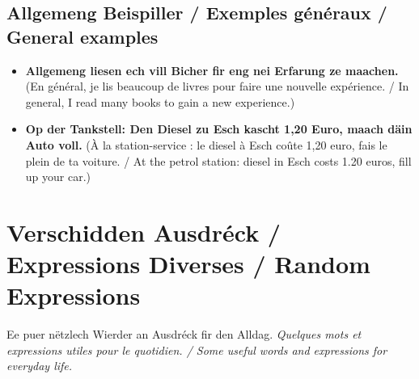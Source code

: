 \subsection{Allgemeng Beispiller / Exemples généraux / General examples}
\begin{itemize}
    \item \textbf{Allgemeng liesen ech vill Bicher fir eng nei Erfarung ze maachen.} (En général, je lis beaucoup de livres pour faire une nouvelle expérience. / In general, I read many books to gain a new experience.)
    \item \textbf{Op der Tankstell: Den Diesel zu Esch kascht 1,20 Euro, maach däin Auto voll.} (À la station-service : le diesel à Esch coûte 1,20 euro, fais le plein de ta voiture. / At the petrol station: diesel in Esch costs 1.20 euros, fill up your car.)
\end{itemize}

\vspace{1cm}

\section{Verschidden Ausdréck / Expressions Diverses / Random Expressions}
Ee puer nëtzlech Wierder an Ausdréck fir den Alldag. \textit{Quelques mots et expressions utiles pour le quotidien. / Some useful words and expressions for everyday life.}

